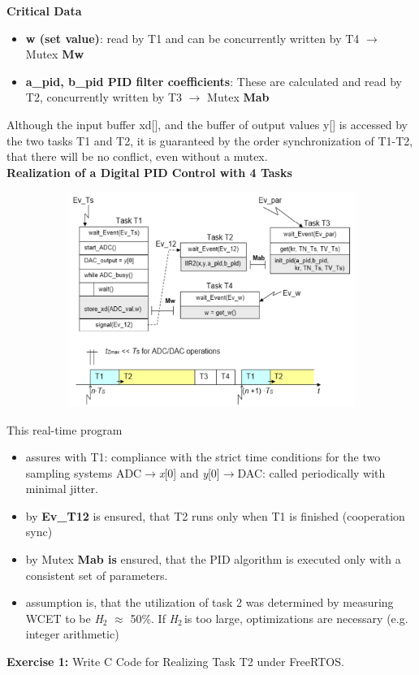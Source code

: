 {\rot\bf Critical Data}

\begin{itemize}
\item \textbf{ w (set value)}: read by T1 and can be concurrently written by T4 $\rightarrow$ Mutex \textbf{Mw}

\item \textbf{ a\_pid, b\_pid PID filter coefficients}: These are calculated and read by T2, concurrently written by T3  $\rightarrow$ Mutex \textbf{Mab}
\end{itemize}

Although the input buffer xd[], and the buffer of output values y[] is accessed by the two tasks T1 and T2, it is guaranteed by the order synchronization of T1-T2, that there will be no conflict, even without a mutex.\\

{\rot\bf  Realization of a Digital PID Control with 4 Tasks}

	\begin{figure}[h]
    \centering
    \includegraphics[width=13cm, height=7cm]{Images/image154.png}
    \label{fig:Fig 106}
    \end{figure}

This real-time program 

\begin{itemize}
\item  assures with T1: compliance with the strict time conditions for the two sampling systems ADC$\rightarrow$\textit{x}[0] and \textit{y}[0]$\rightarrow$DAC: called periodically with minimal jitter.

\item  by \textbf{Ev\_T12} is ensured, that T2 runs only when T1 is finished (cooperation sync)

\item  by Mutex \textbf{Mab is} ensured, that the PID algorithm is executed only with a consistent set of parameters.

\item  assumption is, that the utilization of task 2 was determined by measuring WCET to be \textit{H}${}_{2}$ $\mathrm{\approx}$ 50\%. If \textit{H}${}_{2\ }$is too large, optimizations are necessary (e.g. integer arithmetic) 
\end{itemize}
\newpage
\textbf{Exercise 1:} Write C Code for Realizing Task T2 under FreeRTOS.\\

